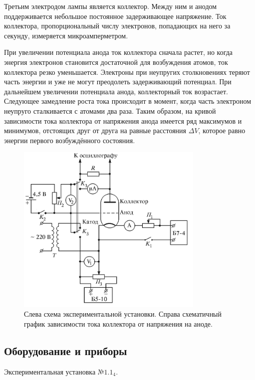 \documentclass[10pt,a4paper]{article}
\begin{document}
	Третьим электродом лампы является коллектор. Между ним и анодом поддерживается небольшое постоянное задерживающее напряжение. Ток коллектора, пропорциональный числу электронов, попадающих на него за секунду, измеряется микроамперметром.
	
	При увеличении потенциала анода ток коллектора сначала растет, но когда энергия электронов становится достаточной для возбуждения атомов, ток коллектора резко уменьшается. Электроны при неупругих столкновениях теряют часть энергии и уже не могут преодолеть задерживающий потенциал. При дальнейшем увеличении потенциала анода, коллекторный ток возрастает. Следующее замедление роста тока происходит в момент, когда часть электроном неупруго сталкивается с атомами два раза. Таким образом, на кривой зависимости тока коллектора от напряжения анода имеется ряд максимумов и минимумов, отстоящих друг от друга на равные расстояния $\Delta V$, которое равно энергии первого возбуждённого состояния.
	
	\begin{figure}[H]
		\centering
		\includegraphics[width=0.8\textwidth]{res/exp_scheme2.png}
		\caption{Слева схема экспериментальной установки. Справа схематичный график зависимости тока коллектора от напряжения на аноде.}
	\end{figure}

	\subsection*{Оборудование и приборы}
	
	Экспериментальная установка $№1.1_4$.
	
\end{document}
